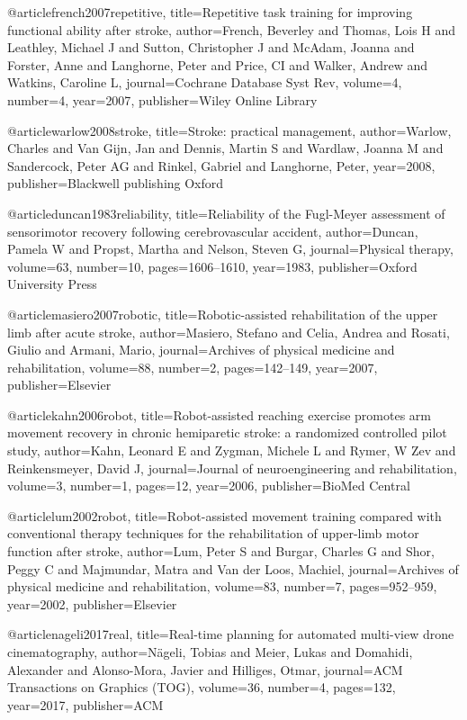 @article{french2007repetitive,
  title={Repetitive task training for improving functional ability after stroke},
  author={French, Beverley and Thomas, Lois H and Leathley, Michael J and Sutton, Christopher J and McAdam, Joanna and Forster, Anne and Langhorne, Peter and Price, CI and Walker, Andrew and Watkins, Caroline L},
  journal={Cochrane Database Syst Rev},
  volume={4},
  number={4},
  year={2007},
  publisher={Wiley Online Library}
}

@article{warlow2008stroke,
  title={Stroke: practical management},
  author={Warlow, Charles and Van Gijn, Jan and Dennis, Martin S and Wardlaw, Joanna M and Sandercock, Peter AG and Rinkel, Gabriel and Langhorne, Peter},
  year={2008},
  publisher={Blackwell publishing Oxford}
}

@article{duncan1983reliability,
  title={Reliability of the Fugl-Meyer assessment of sensorimotor recovery following cerebrovascular accident},
  author={Duncan, Pamela W and Propst, Martha and Nelson, Steven G},
  journal={Physical therapy},
  volume={63},
  number={10},
  pages={1606--1610},
  year={1983},
  publisher={Oxford University Press}
}

@article{masiero2007robotic,
  title={Robotic-assisted rehabilitation of the upper limb after acute stroke},
  author={Masiero, Stefano and Celia, Andrea and Rosati, Giulio and Armani, Mario},
  journal={Archives of physical medicine and rehabilitation},
  volume={88},
  number={2},
  pages={142--149},
  year={2007},
  publisher={Elsevier}
}

@article{kahn2006robot,
  title={Robot-assisted reaching exercise promotes arm movement recovery in chronic hemiparetic stroke: a randomized controlled pilot study},
  author={Kahn, Leonard E and Zygman, Michele L and Rymer, W Zev and Reinkensmeyer, David J},
  journal={Journal of neuroengineering and rehabilitation},
  volume={3},
  number={1},
  pages={12},
  year={2006},
  publisher={BioMed Central}
}

@article{lum2002robot,
  title={Robot-assisted movement training compared with conventional therapy techniques for the rehabilitation of upper-limb motor function after stroke},
  author={Lum, Peter S and Burgar, Charles G and Shor, Peggy C and Majmundar, Matra and Van der Loos, Machiel},
  journal={Archives of physical medicine and rehabilitation},
  volume={83},
  number={7},
  pages={952--959},
  year={2002},
  publisher={Elsevier}
}

@article{nageli2017real,
  title={Real-time planning for automated multi-view drone cinematography},
  author={N{\"a}geli, Tobias and Meier, Lukas and Domahidi, Alexander and Alonso-Mora, Javier and Hilliges, Otmar},
  journal={ACM Transactions on Graphics (TOG)},
  volume={36},
  number={4},
  pages={132},
  year={2017},
  publisher={ACM}
}

